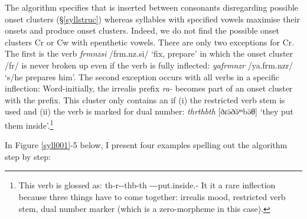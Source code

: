 The algorithm specifies that  is inserted between consonants disregarding possible onset clusters (\S{}\ref{syllstruc}) whereas syllables with specified vowels maximise their onsets and produce onset clusters. Indeed, we do not find the possible onset clusters Cr or Cw with epenthetic vowels. There are only two exceptions for Cr. The first is the verb \emph{frmnzsi} /frm.nz.si/ `fix, prepare' in which the onset cluster /fr/ is never broken up even if the verb is fully inflected: \emph{yafrmnzr} /ya.frm.nzr/ `s/he prepares him'. The second exception occurs with all verbs in a specific inflection: Word-initially, the irrealis prefix \emph{ra-} becomes part of an onset cluster with the  prefix. This cluster only contains an  if (i) the restricted verb stem is used and (ii) the verb is marked for dual number: \emph{thrthbth} [ðɾə̆ðə̆ᵐbə̆θ] `they put them inside'.\footnote{This verb is glossed as: th-r-\Zero{}-thb-th \Stnsg-\Irr-\Ndu-put.inside.\Rs{}-\Stnsg{} It it a rare inflection because three things have to come together: irrealis mood, restricted verb stem, dual number marker (which is a zero-morpheme in this case).}%

In Figure \ref{syll001}-5 below, I present four examples spelling out the algorithm step by step:

